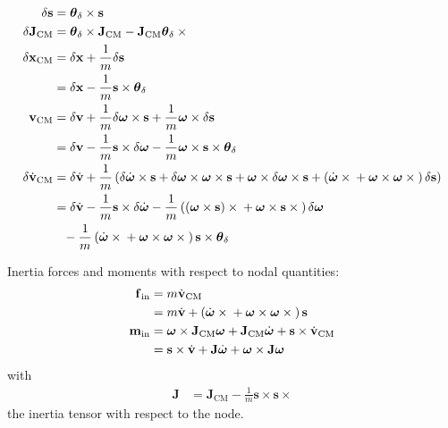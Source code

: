 \documentclass[10pt,dvips,fleqn,subeqn]{report}
\newcommand{\T}[1]{\bm{\mathbf{#1}}}
\newcommand{\TT}[1]{\bm{\mathbf{#1}}}
\begin{document}
\begin{subequations}
\begin{align}
	\delta\T{s}
		&= \T{\theta}_{\delta} \times \T{s} \\
	\delta \TT{J}_{\text{CM}}
		&= \T{\theta}_{\delta} \times \TT{J}_{\text{CM}}
		- \TT{J}_{\text{CM}} \T{\theta}_{\delta} \times{} \\
	\delta\T{x}_{\text{CM}}
		&= \delta\T{x} + \frac{1}{m} \delta\T{s}
		\nonumber \\
		&= \delta\T{x} - \frac{1}{m} \T{s} \times \T{\theta}_{\delta} \\
	\T{v}_{\text{CM}}
		&= \delta\T{v}
		+ \frac{1}{m} \delta\T{\omega} \times \T{s}
		+ \frac{1}{m} \T{\omega} \times \delta\T{s}
		\nonumber \\
		&= \delta\T{v}
		- \frac{1}{m} \T{s} \times \delta\T{\omega}
		- \frac{1}{m} \T{\omega} \times \T{s} \times \T{\theta}_{\delta} \\
	\delta\dot{\T{v}}_{\text{CM}}
		&= \delta\dot{\T{v}}
		+ \frac{1}{m}\plbr{
			\delta\dot{\T{\omega}}\times\T{s}
			+ \delta\T{\omega}\times\T{\omega}\times\T{s}
			+ \T{\omega}\times\delta\T{\omega}\times\T{s}
			+ \plbr{
				\dot{\T{\omega}}\times{}
				+ \T{\omega}\times\T{\omega}\times{}
			} \delta\T{s}
		}
		\nonumber \\
		&= \delta\dot{\T{v}}
			- \frac{1}{m} \T{s} \times \delta\dot{\T{\omega}}
			- \frac{1}{m} \plbr{
				\plbr{\T{\omega}\times\T{s}}\times{}
				+ \T{\omega}\times\T{s}\times{}
			} \delta\T{\omega}
		\nonumber \\ &\hphantom{=}
			- \frac{1}{m} \plbr{
				\dot{\T{\omega}}\times{}
				+ \T{\omega}\times\T{\omega}\times{}
			} \T{s}\times\T{\theta}_{\delta}
\end{align}
\end{subequations}

Inertia forces and moments with respect to nodal quantities:
\begin{subequations}
\begin{align}
	\T{f}_{\text{in}} &= m \dot{\T{v}}_{\text{CM}}
	\nonumber \\
	&=
	m \dot{\T{v}}
	+ \plbr{
		\dot{\T{\omega}} \times{}
		+ \T{\omega} \times \T{\omega} \times{}
	} \T{s} \\
	\T{m}_{\text{in}} &=
	\T{\omega} \times \TT{J}_{\text{CM}} \T{\omega}
	+ \TT{J}_{\text{CM}} \dot{\T{\omega}}
	+ \T{s} \times \dot{\T{v}}_{\text{CM}}
	\nonumber \\
	&= \T{s} \times \dot{\T{v}}
	+ \TT{J} \dot{\T{\omega}}
	+ \T{\omega} \times \TT{J} \T{\omega}
\end{align}
\end{subequations}
with
\begin{align}
	\TT{J} &= \TT{J}_{\text{CM}} - \frac{1}{m} \T{s} \times \T{s} \times{}
\end{align}
the inertia tensor with respect to the node.
\end{document}
